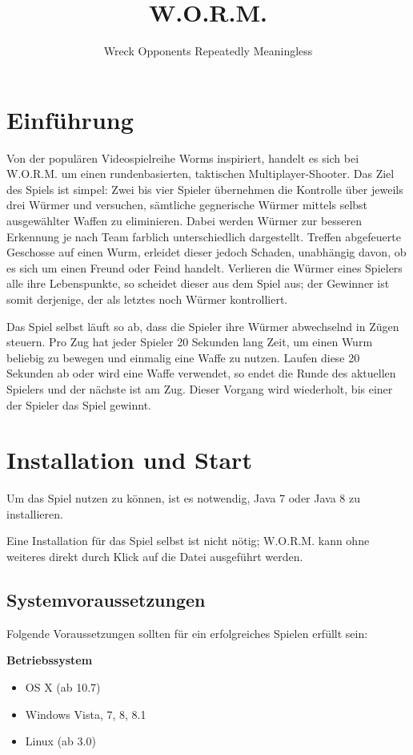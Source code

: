 \documentclass{scrreprt}
\title{W.O.R.M.}
\author{Wreck Opponents Repeatedly Meaningless}
\begin{document}
 
\maketitle
\tableofcontents
\thispagestyle{empty}
\newpage
\setcounter{page}{3}

\chapter{Einführung}
Von der populären Videospielreihe Worms inspiriert, handelt es sich bei W.O.R.M. um einen rundenbasierten, taktischen Multiplayer-Shooter. Das Ziel des Spiels ist simpel:
Zwei bis vier Spieler übernehmen die Kontrolle über jeweils drei Würmer und versuchen, sämtliche gegnerische Würmer mittels selbst ausgewählter Waffen zu eliminieren. Dabei werden Würmer zur besseren Erkennung je nach Team farblich unterschiedlich dargestellt. Treffen abgefeuerte Geschosse auf einen Wurm, erleidet dieser jedoch Schaden, unabhängig davon, ob es sich um einen Freund oder Feind handelt.
Verlieren die Würmer eines Spielers alle ihre Lebenspunkte, so scheidet dieser aus dem Spiel aus; der Gewinner ist somit derjenige, der als letztes noch Würmer kontrolliert.

Das Spiel selbst läuft so ab, dass die Spieler ihre Würmer abwechselnd in Zügen steuern. Pro Zug hat jeder Spieler 20 Sekunden lang Zeit, um einen Wurm beliebig zu bewegen und einmalig eine Waffe zu nutzen. Laufen diese 20 Sekunden ab oder wird eine Waffe verwendet, so endet die Runde des aktuellen Spielers und der nächste ist am Zug. Dieser Vorgang wird wiederholt, bis einer der Spieler das Spiel gewinnt.

\chapter{Installation und Start}
Um das Spiel nutzen zu können, ist es notwendig, Java 7 oder Java 8 zu installieren.

Eine Installation für das Spiel selbst ist nicht nötig; W.O.R.M. kann ohne weiteres direkt durch Klick auf die Datei ausgeführt werden.

\section{Systemvoraussetzungen}

Folgende Voraussetzungen sollten für ein erfolgreiches Spielen erfüllt sein:

\textbf{Betriebssystem}
\begin{itemize} 
\item OS X (ab 10.7)
\item Windows Vista, 7, 8, 8.1
\item Linux (ab 3.0)
\end{itemize}
\end{document}
